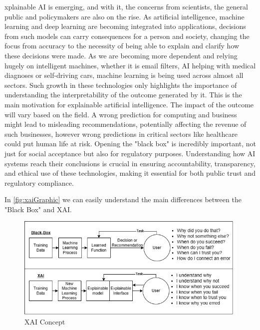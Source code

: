 \documentclass[10pt,journal,compsoc]{IEEEtran}
\begin{document}
xplainable AI is emerging, and with it, the concerns from scientists, the general public and policymakers are also on the rise. As artificial intelligence, machine learning and deep learning are becoming integrated into applications, decisions from such models can carry consequences for a person and society, changing the focus from accuracy to the necessity of being able to explain and clarify how these decisions were made.\cite{analytical-review} As we are becoming more dependent and relying hugely on intelligent machines, whether it is email filters, AI helping with medical diagnoses or self-driving cars, machine learning is being used across almost all sectors. Such growth in these technologies only highlights the importance of understanding the interpretability of the outcome generated by it. This is the main motivation for explainable artificial intelligence.\cite{doshivelez2017rigorous} 
The impact of the outcome will vary based on the field. A wrong prediction for computing and business might lead to misleading recommendations, potentially affecting the revenue of such businesses, however wrong predictions in critical sectors like healthcare could put human life at risk. Opening the "black box" is incredibly important, not just for social acceptance but also for regulatory purposes. Understanding how AI systems reach their conclusions is crucial in ensuring accountability, transparency, and ethical use of these technologies, making it essential for both public trust and regulatory compliance.\cite{analytical-review}

In \autoref{fig:xaiGraphic} we can easily understand the main differences between the "Black Box" and XAI.\cite{xai-concept}

\begin{figure}[h]
    \centering
    \includegraphics[scale=0.37]{xaiGraphic.png}
    \caption{XAI Concept}
    \label{fig:xaiGraphic}
\end{figure}
\end{document}
